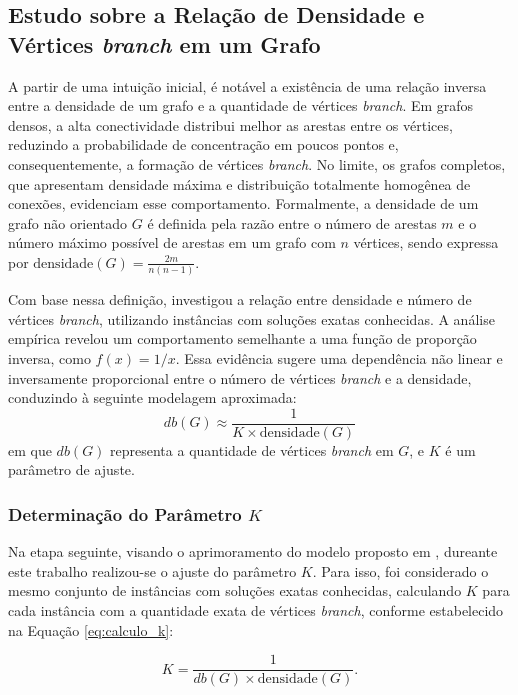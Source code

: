 \subsection{Estudo sobre a Relação de Densidade e Vértices \textit{branch} em um Grafo}
\label{sec-metodo-densidade}

A partir de uma intuição inicial, é notável a existência de uma relação inversa entre a densidade de um grafo e a quantidade de vértices \textit{branch}. Em grafos densos, a alta conectividade distribui melhor as arestas entre os vértices, reduzindo a probabilidade de concentração em poucos pontos e, consequentemente, a formação de vértices \textit{branch}. No limite, os grafos completos, que apresentam densidade máxima e distribuição totalmente homogênea de conexões, evidenciam esse comportamento. Formalmente, a densidade de um grafo não orientado $G$ é definida pela razão entre o número de arestas $m$ e o número máximo possível de arestas em um grafo com $n$ vértices, sendo expressa por $\text{densidade}(G) = \frac{2m}{n(n - 1)}$.

Com base nessa definição, \cite{lima2024ils} investigou a relação entre densidade e número de vértices \textit{branch}, utilizando instâncias com soluções exatas conhecidas. A análise empírica revelou um comportamento semelhante a uma função de proporção inversa, como $f(x) = 1/x$. Essa evidência sugere uma dependência não linear e inversamente proporcional entre o número de vértices \textit{branch} e a densidade, conduzindo à seguinte modelagem aproximada:
\begin{equation}
db(G) \approx \frac{1}{K \times \text{densidade}(G)}
\label{eq:densidadeXalfa}
\end{equation}
em que $db(G)$ representa a quantidade de vértices \textit{branch} em $G$, e $K$ é um parâmetro de ajuste.  

\subsubsection{Determinação do Parâmetro $K$}
Na etapa seguinte, visando o aprimoramento do modelo proposto em \cite{lima2024ils}, dureante este trabalho realizou-se o ajuste do parâmetro $K$. Para isso, foi considerado o mesmo conjunto de instâncias com soluções exatas conhecidas, calculando $K$ para cada instância com a quantidade exata de vértices \textit{branch}, conforme estabelecido na Equação \ref{eq:calculo_k}:

\begin{equation}
\label{eq:calculo_k}
K = \frac{1}{db(G) \times \text{densidade}(G)}.
\end{equation}

